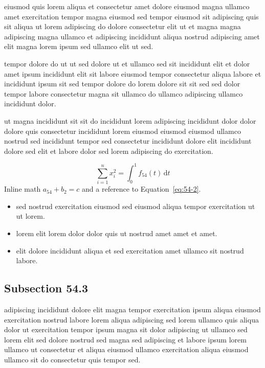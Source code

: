 \documentclass{article}
\begin{document}
eiusmod quis lorem aliqua et consectetur amet dolore eiusmod magna ullamco amet exercitation tempor magna eiusmod sed tempor eiusmod sit adipiscing quis sit aliqua ut lorem adipiscing do dolore consectetur elit ut et magna magna adipiscing magna ullamco et adipiscing incididunt aliqua nostrud adipiscing amet elit magna lorem ipsum sed ullamco elit ut sed.

tempor dolore do ut ut sed dolore ut et ullamco sed sit incididunt elit et dolor amet ipsum incididunt elit sit labore eiusmod tempor consectetur aliqua labore et incididunt ipsum sit sed tempor dolore do lorem dolore sit sit sed sed dolor tempor labore consectetur magna sit ullamco do ullamco adipiscing ullamco incididunt dolor.

ut magna incididunt sit sit do incididunt lorem adipiscing incididunt dolor dolor dolore quis consectetur incididunt lorem eiusmod eiusmod eiusmod ullamco nostrud sed incididunt tempor sed consectetur incididunt dolore elit incididunt dolore sed elit et labore dolor sed lorem adipiscing do exercitation.

\begin{equation}\label{eq:54-2}
  \sum_{i=1}^{n} x_i^{2} = \int_0^1 f_{54}(t)\,\mathrm{d}t
\end{equation}
Inline math $a_{54} + b_{2} = c$ and a reference to Equation~\eqref{eq:54-2}.

\begin{itemize}
  \item sed nostrud exercitation eiusmod sed eiusmod aliqua tempor exercitation ut ut lorem.
  \item lorem elit lorem dolor dolor quis ut nostrud amet amet et amet.
  \item elit dolore incididunt aliqua et sed exercitation amet ullamco sit nostrud labore.
\end{itemize}

\subsection{Subsection 54.3}\label{sec:54-3}
adipiscing incididunt dolore elit magna tempor exercitation ipsum aliqua eiusmod exercitation nostrud labore lorem aliqua adipiscing sed lorem ullamco quis aliqua dolor ut exercitation tempor ipsum magna sit dolor adipiscing ut ullamco sed lorem elit sed dolore nostrud sed magna sed adipiscing et labore ipsum lorem ullamco ut consectetur et aliqua eiusmod ullamco exercitation aliqua eiusmod ullamco sit do consectetur quis tempor sed.
\end{document}
